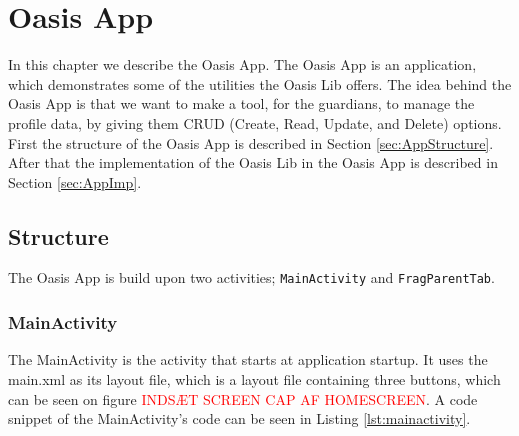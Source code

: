 \chapter{Oasis App}
\label{ch:App}
In this chapter we describe the Oasis App. The Oasis App is an application, which demonstrates some of the utilities the Oasis Lib offers. The idea behind the Oasis App is that we want to make a tool, for the guardians, to manage the profile data, by giving them CRUD (Create, Read, Update, and Delete) options. First the structure of the Oasis App is described in Section \vref{sec:AppStructure}. After that the implementation of the Oasis Lib in the Oasis App is described in Section \vref{sec:AppImp}.

\section{Structure}
\label{sec:AppStructure}
The Oasis App is build upon two activities; \texttt{MainActivity} and \texttt{FragParentTab}.

\subsection{MainActivity}
The MainActivity is the activity that starts at application startup. It uses the main.xml as its layout file, which is a layout file containing three buttons, which can be seen on figure \textcolor{red}{INDS\AE{}T SCREEN CAP AF HOMESCREEN}. A code snippet of the MainActivity's code can be seen in Listing \vref{lst:mainactivity}.

